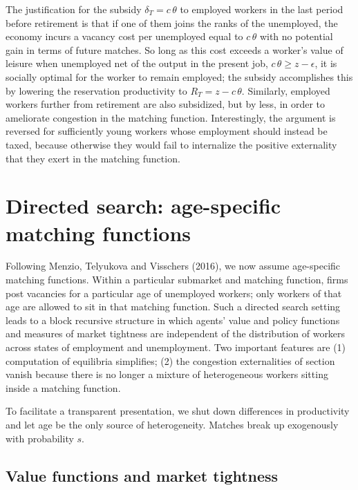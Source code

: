 The justification  for the subsidy $\delta_T=c\,\theta$ to employed workers
in the last period before retirement is that if one of them joins the
ranks of the unemployed, the economy incurs a vacancy cost per unemployed
equal to $c \, \theta$ with no potential gain in terms of future matches.
So long as this cost exceeds a worker's value of leisure when unemployed
net of the output in the present job, $c\,\theta \geq z - \epsilon$, it
is socially optimal for the worker to  remain employed; the subsidy accomplishes this
 by lowering the reservation productivity to
$R_T= z-c \, \theta$.
Similarly, employed workers further  from retirement  are also subsidized, but by less, in order to
ameliorate  congestion in the matching function. Interestingly, the argument is reversed for sufficiently young
workers whose employment should instead be taxed, because otherwise they would
 fail to internalize the positive externality that they
exert in the matching function.



%
\section{Directed search: age-specific matching functions}
\label{sec:OLG2}%
Following Menzio, Telyukova and Visschers (2016), we now
assume age-specific matching functions. Within a particular  submarket and
 matching function, firms post vacancies for a
particular age of  unemployed workers;  only workers of
that age  are allowed to sit in that  matching
function. Such a directed search setting leads to a
block recursive structure in which agents' value and policy
functions and measures of market tightness are independent of
the distribution of workers across states of employment and
unemployment. Two important features are
(1)  computation of equilibria simplifies;
(2)  the congestion externalities of section 
vanish because there is no longer a  mixture  of heterogeneous
workers sitting inside a matching function.

To facilitate a transparent presentation, we shut down differences in
productivity and let age be the only source
of heterogeneity. Matches break up exogenously
with probability $s$.



\subsection{Value functions and market tightness}

